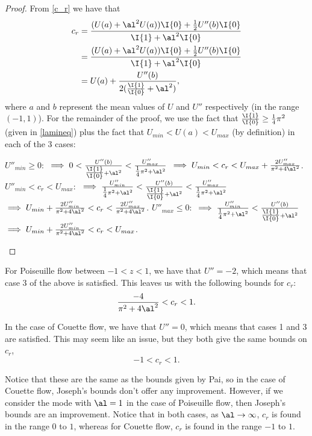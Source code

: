 \begin{proof}
From \eqref{c_r} we have that 
\begin{align*}
    c_r &= \frac{(U(a) + \al^2 U(a)) \I{0} + \tfrac{1}{2} U''(b) \I{0}}{\I{1} + \al^2 \I{0}} \nonumber\\
    &= \frac{(U(a) + \al^2 U(a)) \I{0} + \tfrac{1}{2} U''(b) \I{0}}{\I{1} + \al^2 \I{0}} \nonumber\\
    &= U(a) + \frac{U''(b)}{2(\tfrac{\I{1}}{\I{0}} + \al^2)},
\end{align*}
where $ a $ and $ b $ represent the mean values of $ U $ and $ U'' $ respectively (in the range $ (-1, 1) $). For the remainder of the proof, we use the fact that $ \frac{\I{1}}{\I{0}} \geq \tfrac{1}{4} \pi^2 $ (given in \eqref{lamineq}) plus the fact that $ U_{min} < U(a) < U_{max} $ (by definition) in each of the 3 cases:
\begin{outline}
    \1 $ U''_{min} \geq 0: $
        \2  $ \implies 0 < \frac{U''(b)}{\tfrac{\I{1}}{\I{0}} + \al^2} < \frac{U''_{max}}{\tfrac{1}{4} \pi^2 + \al^2} $
        \2 $ \implies U_{min} < c_r < U_{max} + \frac{2 U''_{max}}{\pi^2 + 4 \al^2} $.
    \1 $ U''_{min} < c_r < U_{max}: $
        \2 $ \implies \frac{U''_{min}}{\tfrac{1}{4} \pi^2 + \al^2} < \frac{U''(b)}{\tfrac{\I{1}}{\I{0}} + \al^2} < \frac{U''_{max}}{\tfrac{1}{4} \pi^2 + \al^2} $
        \2 $ \implies U_{min} + \frac{2 U''_{min}}{\pi^2 + 4 \al^2}< c_r < \frac{2 U''_{max}}{\pi^2 + 4 \al^2} $.
    \1 $ U''_{max} \leq 0: $
        \2 $ \implies \frac{U''_{min}}{\tfrac{1}{4} \pi^2 + \al^2} < \frac{U''(b)}{\tfrac{\I{1}}{\I{0}} + \al^2} $
        \2 $ \implies U_{min} + \frac{2 U''_{min}}{\pi^2 + 4 \al^2}< c_r < U_{max} $.
\end{outline}
\end{proof}

For Poiseuille flow between $ -1 < z < 1 $, we have that $ U'' = -2 $, which means that case 3 of the above is satisfied. This leaves us with the following bounds for $ c_r $:
\begin{equation}
    \frac{-4}{\pi^2 + 4 \al^2} < c_r < 1.
\end{equation}

In the case of Couette flow, we have that $ U'' = 0 $, which means that cases 1 and 3 are satisfied. This may seem like an issue, but they both give the same bounds on $ c_r$, 
\begin{equation}
    -1 < c_r < 1.
\end{equation}

Notice that these are the same as the bounds given by Pai, so in the case of Couette flow, Joseph's bounds don't offer any improvement. However, if we consider the mode with $ \al = 1 $ in the case of Poiseuille flow, then Joseph's bounds are an improvement. Notice that in both cases, as $ \al \to \infty$, $ c_r $ is found in the range $ 0 $ to $ 1 $, whereas for Couette flow, $ c_r $ is found in the range $ -1 $ to $ 1$.

